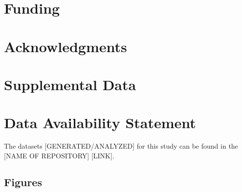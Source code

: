 \documentclass[utf8]{frontiersSCNS} %
\begin{document}
\section*{Funding}

\section*{Acknowledgments}

\section*{Supplemental Data}

\section*{Data Availability Statement}
The datasets [GENERATED/ANALYZED] for this study can be found in the [NAME OF REPOSITORY] [LINK].


\subsection{Figures}
\end{document}
